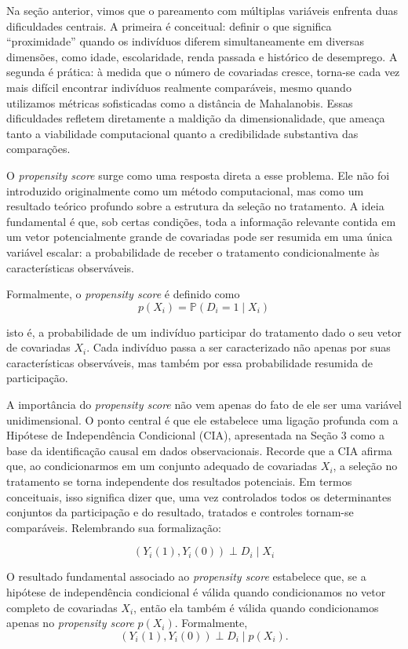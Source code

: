 Na seção anterior, vimos que o pareamento com múltiplas variáveis enfrenta duas dificuldades centrais. A primeira é conceitual: definir o que significa “proximidade” quando os indivíduos diferem simultaneamente em diversas dimensões, como idade, escolaridade, renda passada e histórico de desemprego. A segunda é prática: à medida que o número de covariadas cresce, torna-se cada vez mais difícil encontrar indivíduos realmente comparáveis, mesmo quando utilizamos métricas sofisticadas como a distância de Mahalanobis. Essas dificuldades refletem diretamente a maldição da dimensionalidade, que ameaça tanto a viabilidade computacional quanto a credibilidade substantiva das comparações.

O \textit{propensity score} surge como uma resposta direta a esse problema. Ele não foi introduzido originalmente como um método computacional, mas como um resultado teórico profundo sobre a estrutura da seleção no tratamento. A ideia fundamental é que, sob certas condições, toda a informação relevante contida em um vetor potencialmente grande de covariadas pode ser resumida em uma única variável escalar: a probabilidade de receber o tratamento condicionalmente às características observáveis.

Formalmente, o \textit{propensity score} é definido como
$$
p(X_i) = \mathbb{P}(D_i = 1 \mid X_i)
$$

\noindent isto é, a probabilidade de um indivíduo participar do tratamento dado o seu vetor de covariadas $X_i$. Cada indivíduo passa a ser caracterizado não apenas por suas características observáveis, mas também por essa probabilidade resumida de participação.

A importância do \textit{propensity score} não vem apenas do fato de ele ser uma variável unidimensional. O ponto central é que ele estabelece uma ligação profunda com a Hipótese de Independência Condicional (CIA), apresentada na Seção 3 como a base da identificação causal em dados observacionais. Recorde que a CIA afirma que, ao condicionarmos em um conjunto adequado de covariadas $X_i$, a seleção no tratamento se torna independente dos resultados potenciais. Em termos conceituais, isso significa dizer que, uma vez controlados todos os determinantes conjuntos da participação e do resultado, tratados e controles tornam-se comparáveis. Relembrando sua formalização:

$$
(Y_i(1),Y_i(0)) \perp D_i \mid X_i
$$

O resultado fundamental associado ao \textit{propensity score} estabelece que, se a hipótese de independência condicional é válida quando condicionamos no vetor completo de covariadas $X_i$, então ela também é válida quando condicionamos apenas no \textit{propensity score} $p(X_i)$. Formalmente,
\[
(Y_i(1), Y_i(0)) \perp D_i \mid p(X_i).
\]

